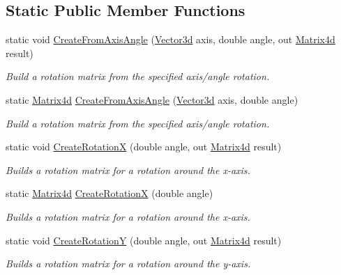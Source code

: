 \subsection*{Static Public Member Functions}
\begin{DoxyCompactItemize}
\item 
static void \hyperlink{struct_open_t_k_1_1_matrix4d_abcae7024e93921baa3814e316ffa2e9e}{Create\-From\-Axis\-Angle} (\hyperlink{struct_open_t_k_1_1_vector3d}{Vector3d} axis, double angle, out \hyperlink{struct_open_t_k_1_1_matrix4d}{Matrix4d} result)
\begin{DoxyCompactList}\small\item\em Build a rotation matrix from the specified axis/angle rotation. \end{DoxyCompactList}\item 
static \hyperlink{struct_open_t_k_1_1_matrix4d}{Matrix4d} \hyperlink{struct_open_t_k_1_1_matrix4d_ab37da43cc766ba0739705f138a285653}{Create\-From\-Axis\-Angle} (\hyperlink{struct_open_t_k_1_1_vector3d}{Vector3d} axis, double angle)
\begin{DoxyCompactList}\small\item\em Build a rotation matrix from the specified axis/angle rotation. \end{DoxyCompactList}\item 
static void \hyperlink{struct_open_t_k_1_1_matrix4d_abade5f686caaea1a6b10c73ed8c4c17c}{Create\-Rotation\-X} (double angle, out \hyperlink{struct_open_t_k_1_1_matrix4d}{Matrix4d} result)
\begin{DoxyCompactList}\small\item\em Builds a rotation matrix for a rotation around the x-\/axis. \end{DoxyCompactList}\item 
static \hyperlink{struct_open_t_k_1_1_matrix4d}{Matrix4d} \hyperlink{struct_open_t_k_1_1_matrix4d_a4b5f60ef92806f0ce97eb189cd233e92}{Create\-Rotation\-X} (double angle)
\begin{DoxyCompactList}\small\item\em Builds a rotation matrix for a rotation around the x-\/axis. \end{DoxyCompactList}\item 
static void \hyperlink{struct_open_t_k_1_1_matrix4d_a796962b225ac03dd5f96c82cd20bf33a}{Create\-Rotation\-Y} (double angle, out \hyperlink{struct_open_t_k_1_1_matrix4d}{Matrix4d} result)
\begin{DoxyCompactList}\small\item\em Builds a rotation matrix for a rotation around the y-\/axis. \end{DoxyCompactList}\item 

\end{DoxyCompactItemize}
